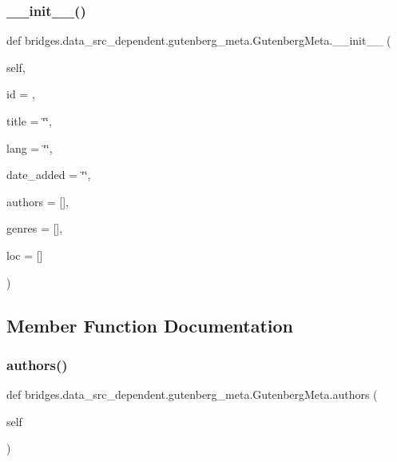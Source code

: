 \subsubsection{\texorpdfstring{\+\_\+\+\_\+init\+\_\+\+\_\+()}{\_\_init\_\_()}}
{\footnotesize\ttfamily def bridges.\+data\+\_\+src\+\_\+dependent.\+gutenberg\+\_\+meta.\+Gutenberg\+Meta.\+\_\+\+\_\+init\+\_\+\+\_\+ (\begin{DoxyParamCaption}\item[{}]{self,  }\item[{}]{id = {},  }\item[{}]{title = {\ttfamily \char`\"{}\char`\"{}},  }\item[{}]{lang = {\ttfamily \char`\"{}\char`\"{}},  }\item[{}]{date\+\_\+added = {\ttfamily \char`\"{}\char`\"{}},  }\item[{}]{authors = {\ttfamily \mbox{[}\mbox{]}},  }\item[{}]{genres = {\ttfamily \mbox{[}\mbox{]}},  }\item[{}]{loc = {\ttfamily \mbox{[}\mbox{]}} }\end{DoxyParamCaption})}



\subsection{Member Function Documentation}
\mbox{\label{classbridges_1_1data__src__dependent_1_1gutenberg__meta_1_1_gutenberg_meta_a6d855d7890d2058321310fbab782f5fd}} 
\subsubsection{\texorpdfstring{authors()}{authors()}\hspace{0.1cm}{\footnotesize\ttfamily [1/2]}}
{\footnotesize\ttfamily def bridges.\+data\+\_\+src\+\_\+dependent.\+gutenberg\+\_\+meta.\+Gutenberg\+Meta.\+authors (\begin{DoxyParamCaption}\item[{}]{self }\end{DoxyParamCaption})}



